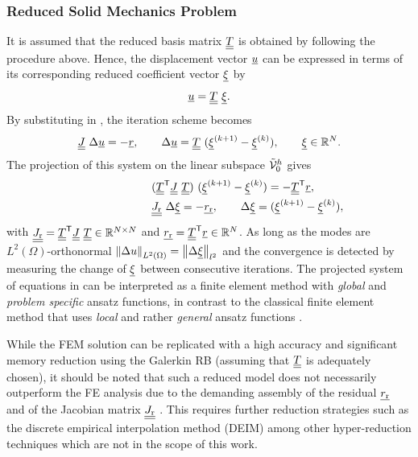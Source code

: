 \subsubsection{Reduced Solid Mechanics Problem}
\label{sec:solid_rom}
It is assumed that the reduced basis matrix $\underline{\underline{T}}$ is obtained by following the procedure above. Hence, the displacement vector $\underline{u}$ can be expressed in terms of its corresponding reduced coefficient vector $\underline{\xi}$ by
\begin{equation}
	\underline{u}=\underline{\underline{T}} \ \underline{\xi}.
\end{equation}
By substituting in , the iteration scheme becomes
\begin{equation}
	\begin{split}
		\mJ \ \Delta\vu = - \vek{r}, \qquad    \Delta\vu = \mT \ (\vxi^{(k+1)} - \vxi^{( k)}), \qquad \vxi \in \ffR^N.
	\end{split}
	\label{eq:NR_halfReduce}
\end{equation}
The projection of this system on the linear subspace ${\tilde{{\cal V}}}_0^h$ gives
\begin{equation}
	\begin{split}
		\hspace{2.4cm}
		& ({\underline{\underline{T}}}^{\sf T} \underline{\underline{J}} \ \underline{\underline{T}}) \ (\underline{\xi}^{( k+1)} - \underline{\xi}^{( k)}) = - {\underline{\underline{T}}}^{\sf T} \underline{r},\\
		& \underline{\underline{J_{\rm r}}} \ \Delta \underline{\xi} = - \underline{r_{\rm r}}, \qquad \Delta \underline{\xi} = (\underline{\xi}^{( k+1)} - \underline{\xi}^{( k)}),
	\end{split}
	\label{eq:NR_reduced}
\end{equation}
with $\underline{\underline{J_{\rm r}}} ={\underline{\underline{T}}}^{\sf T} \underline{\underline{J}} \ \underline{\underline{T}} \in {\mathbb{ R}}^{N \times N}$ and $\underline{r_{\rm r}} = {\underline{\underline{T}}}^{\sf T} \underline{r} \in {\mathbb{ R}}^{N}$. As long as the modes are $L^2(\Omega)$-orthonormal $\left\lVert \Delta u \right\rVert_{L^2(\Omega)}=\left\lVert \Delta \underline{\xi} \right\rVert_{l^2}$ and the convergence is detected by measuring the change of $\underline{\xi}$ between consecutive iterations. The projected system of equations in  can be interpreted as a finite element method with \emph{global} and \emph{problem specific} ansatz functions, in contrast to the classical finite element method that uses \emph{local} and rather \emph{general} ansatz functions \parencite{cosimor2016comparison}.

While the FEM solution can be replicated with a high accuracy and significant memory reduction using the Galerkin RB (assuming that $\underline{\underline{T}}$ is adequately chosen), it should be noted that such a reduced model does not necessarily outperform the FE analysis due to the demanding assembly of the residual $\underline{r_{\rm r}}$ and of the Jacobian matrix $\underline{\underline{J_{\rm r}}}$ \parencite{cosimor2016comparison}. This requires further reduction strategies such as the discrete empirical interpolation method (DEIM) among other hyper-reduction techniques which are not in the scope of this work.

